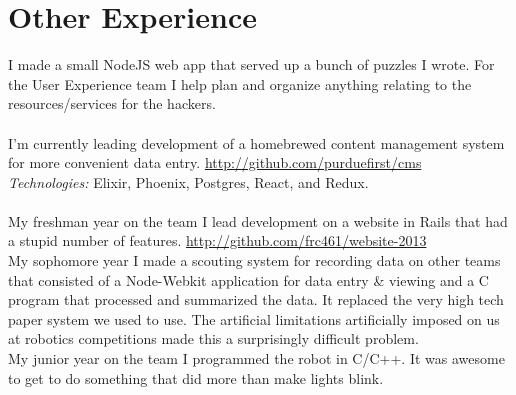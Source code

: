 \documentclass[11pt,letter,sans]{moderncv}
\begin{document}
\section{Other Experience}
I made a small NodeJS web app that served up a bunch of puzzles I wrote.
For the User Experience team I help plan and organize anything relating to the resources/services for the hackers.
\\
\\
I'm currently leading development of a homebrewed content management system for more convenient data entry. \url{http://github.com/purduefirst/cms}
\\
\textit{Technologies:} Elixir, Phoenix, Postgres, React, and Redux.
\\
\\
My freshman year on the team I lead development on a website in Rails that had a stupid number of features. \url{http://github.com/frc461/website-2013}
\\
My sophomore year I made a scouting system for recording data on other teams that consisted of a Node-Webkit application for data entry \& viewing and a C program that processed and summarized the data.
It replaced the very high tech paper system we used to use.
The artificial limitations artificially imposed on us at robotics competitions made this a surprisingly difficult problem.
\\
My junior year on the team I programmed the robot in C/C++.
It was awesome to get to do something that did more than make lights blink.
\end{document}
